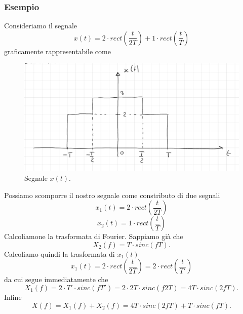 \documentclass[12pt,oneside,openany]{memoir}
\numberwithin{equation}{subsection}
\begin{document}

\subsubsection{Esempio}
Consideriamo il segnale
\[
	x(t) = 2 \cdot rect\left(\frac{t}{2T}\right) +
	1 \cdot rect\left(\frac{t}{T}\right)
\]
graficamente rappresentabile come
\begin{figure}[H]
	\centering
	\captionsetup{justification=centering}
	\includegraphics[width=1.0\textwidth]{images/esempio_14_03_2018.png}
	\caption{Segnale $x(t)$.}
\end{figure}
\noindent
Possiamo scomporre il nostro segnale come constributo di due segnali
\[
	x_1(t) = 2 \cdot rect\left(\frac{t}{2T}\right)
\]
\[
	x_2(t) = 1 \cdot rect\left(\frac{t}{T}\right)
\]
Calcoliamone la trasformata di Fourier.
\bigbreak\noindent
Sappiamo gi\`a che 
\[
	X_2(f) = T \cdot sinc(f T).
\]
Calcoliamo quindi la trasformata di $x_1(t)$
\[
	x_1(t) = 2 \cdot rect\left(\frac{t}{2T}\right) =
	2 \cdot rect\left(\frac{t}{T'}\right)
\]
da cui segue immediatamente che
\[
	X_1(f) = 2 \cdot T' \cdot sinc(f T') =
	2 \cdot 2T \cdot sinc(f 2T) =
	4T \cdot sinc(2 f T).
\]
Infine
\[
	X(f) = X_1(f) + X_2(f) =
	4T \cdot sinc(2 f T) + T \cdot sinc(f T).
\]

\end{document}
